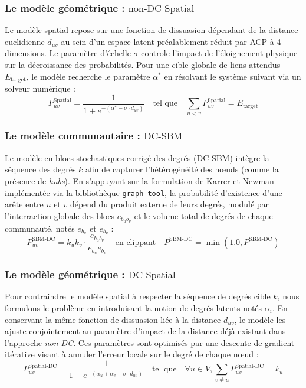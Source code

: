 \subsubsection{Le modèle géométrique : $\text{non-DC Spatial}$}
Le modèle spatial repose sur une fonction de dissuasion dépendant de la distance euclidienne $d_{uv}$ au sein d'un espace latent préalablement réduit par ACP à 4 dimensions. Le paramètre d'échelle $\sigma$ controle l'impact de l'éloignement physique sur la décroissance des probabilités. Pour une cible globale de liens attendus $E_{\text{target}}$, le modèle recherche le paramètre $\alpha^*$ en résolvant le système suivant via un solveur numérique :
\begin{equation}
    P^{\text{Spatial}}_{uv} = \frac{1}{1 + e^{-(\alpha^* - \sigma \cdot d_{uv})}} \quad \text{tel que} \quad \sum_{u < v} P^{\text{Spatial}}_{uv} = E_{\text{target}}
\end{equation}

\subsubsection{Le modèle communautaire : $\text{DC-SBM}$}
Le modèle en blocs stochastiques corrigé des degrés ($\text{DC-SBM}$) intègre la séquence des degrés $k$ afin de capturer l'hétérogénéité des nœuds (comme la présence de \textit{hubs}). En s'appuyant sur la formulation de Karrer et Newman \cite{karrer2011stochastic} implémentée via la bibliothèque \texttt{graph-tool}, la probabilité d'existence d'une arête entre $u$ et $v$ dépend du produit externe de leurs degrés, modulé par l'interraction globale des blocs $e_{b_u b_v}$ et le volume total de degrés de chaque communauté, notés $e_{b_u}$ et $e_{b_v}$ :
\begin{equation}
    P^{\text{SBM-DC}}_{uv} = k_u k_v \cdot \frac{e_{b_u b_v}}{e_{b_u} e_{b_v}} \quad \text{en clippant} \quad P^{\text{SBM-DC}} = \min(1.0, P^{\text{SBM-DC}})
\end{equation}

\subsubsection{Le modèle géométrique : $\text{DC-Spatial}$}
Pour contraindre le modèle spatial à respecter la séquence de degrés cible $k$, nous formulons le problème en introduisant la notion de degrés latents notés $\alpha_i$. En conservant la même fonction de dissuasion liée à la distance $d_{uv}$, le modèle les ajuste conjointement au paramètre d'impact de la distance déjà existant dans l'approche \textit{non-DC}. Ces paramètres sont optimisés par une descente de gradient itérative visant à annuler l'erreur locale sur le degré de chaque nœud :
\begin{equation}
    P^{\text{Spatial-DC}}_{uv} = \frac{1}{1 + e^{-(\alpha_u + \alpha_v - \sigma \cdot d_{uv})}} \quad \text{tel que} \quad \forall u \in V, \sum_{v \neq u} P^{\text{Spatial-DC}}_{uv} = k_u
\end{equation}

